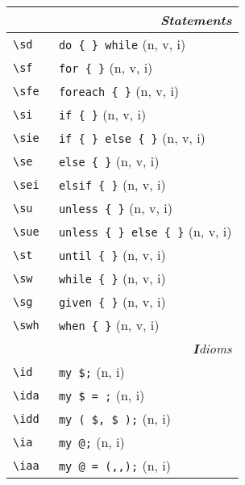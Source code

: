 \documentclass[oneside,10pt,landscape,DIV17]{scrartcl}
\begin{document}
\begin{multicols}{3}
\begin{center}
\begin{tabular}[]{|p{11mm}|p{60mm}|}
\hline
\multicolumn{2}{|r|}{\textsl{\textbf{S}tatements}}                    \\[1.0ex]
\hline \verb'\sd'      & \verb'do { } while'          \hfill (n, v, i)\\
\hline \verb'\sf'      & \verb'for { }'               \hfill (n, v, i)\\
\hline \verb'\sfe'     & \verb'foreach { }'           \hfill (n, v, i)\\
\hline \verb'\si'      & \verb'if { }'                \hfill (n, v, i)\\
\hline \verb'\sie'     & \verb'if { } else { }'       \hfill (n, v, i)\\
\hline \verb'\se'      & \verb'else { }'              \hfill (n, v, i)\\
\hline \verb'\sei'     & \verb'elsif { }'             \hfill (n, v, i)\\
\hline \verb'\su'      & \verb'unless { }'            \hfill (n, v, i)\\
\hline \verb'\sue'     & \verb'unless { } else { }'   \hfill (n, v, i)\\
\hline \verb'\st'      & \verb'until { }'             \hfill (n, v, i)\\
\hline \verb'\sw'      & \verb'while { }'             \hfill (n, v, i)\\
\hline \verb'\sg'      & \verb'given { }'             \hfill (n, v, i)\\
\hline \verb'\swh'     & \verb'when { }'              \hfill (n, v, i)\\
\hline
\hline
\multicolumn{2}{|r|}{\textsl{\textbf{I}dioms}}                 \\[1.0ex]
\hline \verb'\id  '  & \verb'my $;'              \hfill (n, i)   \\
\hline \verb'\ida '  & \verb'my $ = ;'           \hfill (n, i)   \\
\hline \verb'\idd '  & \verb'my ( $, $ );'       \hfill (n, i)   \\
\hline \verb'\ia  '  & \verb'my @;'              \hfill (n, i)   \\
\hline \verb'\iaa '  & \verb'my @ = (,,);'       \hfill (n, i)   \\

\end{tabular}
\end{center}
\end{multicols}
\end{document}
